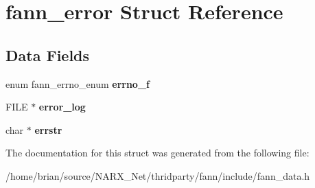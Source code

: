 \hypertarget{structfann__error}{\section{fann\-\_\-error Struct Reference}
\label{structfann__error}
}
\subsection*{Data Fields}
\begin{DoxyCompactItemize}
\item 
\hypertarget{structfann__error_a5b46be6dfa18da5620d4ce1b8654f0af}{enum fann\-\_\-errno\-\_\-enum {\bfseries errno\-\_\-f}}\label{structfann__error_a5b46be6dfa18da5620d4ce1b8654f0af}

\item 
\hypertarget{structfann__error_a0942b9a4f7a184e9d6b95901e2b9ba4f}{F\-I\-L\-E $\ast$ {\bfseries error\-\_\-log}}\label{structfann__error_a0942b9a4f7a184e9d6b95901e2b9ba4f}

\item 
\hypertarget{structfann__error_ac3a29d5a3e50771c8ce7cf18bc093a6e}{char $\ast$ {\bfseries errstr}}\label{structfann__error_ac3a29d5a3e50771c8ce7cf18bc093a6e}

\end{DoxyCompactItemize}


The documentation for this struct was generated from the following file\-:\begin{DoxyCompactItemize}
\item 
/home/brian/source/\-N\-A\-R\-X\-\_\-\-Net/thridparty/fann/include/fann\-\_\-data.\-h\end{DoxyCompactItemize}
